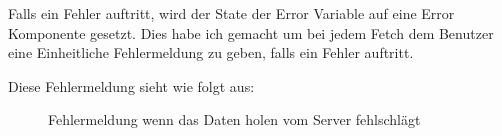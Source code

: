 Falls ein Fehler auftritt, wird der State der Error Variable auf eine Error Komponente gesetzt. Dies
habe ich gemacht um bei jedem Fetch dem Benutzer eine Einheitliche Fehlermeldung zu geben, falls ein 
Fehler auftritt.


Diese Fehlermeldung sieht wie folgt aus:
\begin{figure}[H]
    \begin{center}
      \caption{Fehlermeldung wenn das Daten holen vom Server fehlschlägt}
    \end{center}
  \end{figure}
  